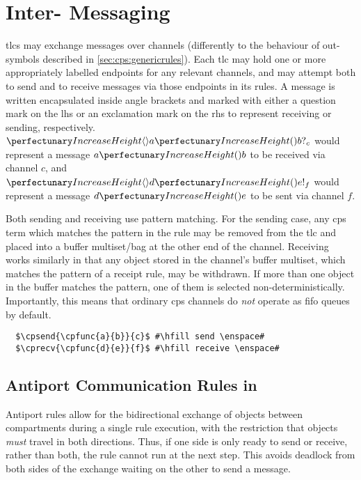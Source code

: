 \section{\label{sec:cps:intertlcmess}Inter- Messaging}

\Glspl{tlc} may exchange messages over channels (differently to the behaviour of out-symbols described in \cref{sec:cps:genericrules}).  Each \gls{tlc} may hold one or more appropriately labelled endpoints for any relevant channels, and may attempt both to send and to receive messages via those endpoints in its rules.  A message is written encapsulated inside angle brackets and marked with either a question mark on the \gls{lhs} or an exclamation mark on the \gls{rhs} to represent receiving or sending, respectively.  \Eg{} \(\cprecv{\cpfunc{a}{b}}{c}\) would represent a message \(\cpfunc{a}{b}\) to be received via channel \(c\), and \(\cpsend{\cpfunc{d}{e}}{f}\) would represent a message \(\cpfunc{d}{e}\) to be sent via channel \(f\).

Both sending and receiving use pattern matching.  For the sending case, any \gls{cps} term which matches the pattern in the rule may be removed from the \gls{tlc} and placed into a buffer multiset/bag at the other end of the channel.  Receiving works similarly in that any object stored in the channel's buffer multiset, which matches the pattern of a receipt rule, may be withdrawn.  If more than one object in the buffer matches the pattern, one of them is selected non-deterministically.  Importantly, this means that ordinary \gls{cps} channels do \emph{not} operate as \gls{fifo} queues by default.

\lstset{xleftmargin=.5in, xrightmargin=.5in} 
\begin{lstlisting}
  $\cpsend{\cpfunc{a}{b}}{c}$ #\hfill send \enspace#
  $\cprecv{\cpfunc{d}{e}}{f}$ #\hfill receive \enspace#
\end{lstlisting}

\subsection{\label{sec:cps:antiport}Antiport Communication Rules in }

Antiport rules \cite{Orellana-Martin2019,Paun2002} allow for the bidirectional exchange of objects between \glspl{compartment} during a single rule execution, with the restriction that objects \emph{must} travel in both directions.  Thus, if one side is only ready to send or receive, rather than both, the rule cannot run at the next step.  This avoids deadlock from both sides of the exchange waiting on the other to send a message.

